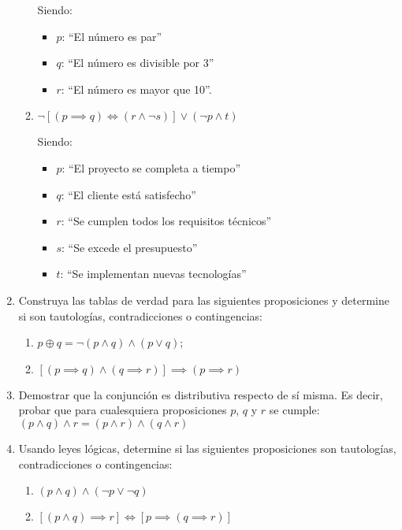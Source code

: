 \begin{enumerate}[label=\textbf{\arabic*}.]
\begin{enumerate}[label=\alph*)]
		Siendo:
		\begin{itemize}[itemsep=-3pt]
			\item $p$: ``El número es par''
			\item $q$: ``El número es divisible por 3''
			\item $r$: ``El número es mayor que 10''.
		\end{itemize}
		
		\item $\neg [(p \implies q) \iff (r \land \neg s)] \lor (\neg p \land t)$
		
		Siendo:
		\begin{itemize}[itemsep=-3pt]
			\item $p$: ``El proyecto se completa a tiempo''
			\item $q$: ``El cliente está satisfecho''
			\item $r$: ``Se cumplen todos los requisitos técnicos''
			\item $s$: ``Se excede el presupuesto''
			\item $t$: ``Se implementan nuevas tecnologías''
		\end{itemize}
	\end{enumerate}
	\item Construya las tablas de verdad para las siguientes proposiciones y determine si son tautologías, contradicciones o contingencias:
	\begin{enumerate}[label=\alph*)]
		\item $p \oplus q = \neg (p \land q) \land (p \lor q)$;
		\item $\left[(p \implies q) \land (q \implies r)\right] \implies (p \implies r)$
	\end{enumerate}
	
	\item Demostrar que la conjunción es distributiva respecto de sí misma. Es decir, probar que para cualesquiera proposiciones \(p\), \(q\) y \(r\) se cumple: \((p \land q) \land r = (p \land r) \land (q \land r) \)
	
	\item Usando leyes lógicas, determine si las siguientes proposiciones son tautologías, contradicciones o contingencias:
	\begin{enumerate}
		\item \( (p \land q) \land (\neg p \lor \neg q) \)
		\item $\left[ (p \land q) \implies r \right] \iff \left[p \implies (q \implies r)\right]$
	\end{enumerate}
	

\end{enumerate}
